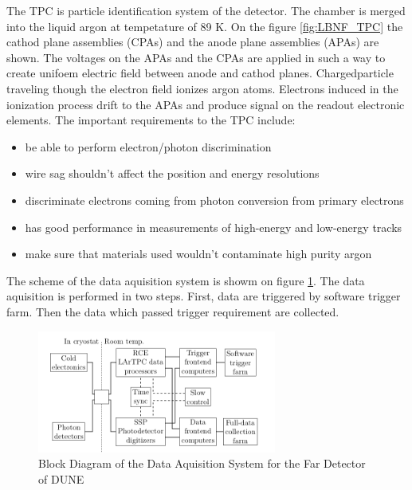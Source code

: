 The TPC is particle identification system of the detector. The chamber is merged into the liquid argon at tempetature of 89 K. On the figure \ref{fig:LBNF_TPC} the cathod plane assemblies (CPAs) and the anode plane assemblies (APAs) are shown. The voltages on the APAs and the CPAs are applied in such a way to create unifoem electric field between anode and cathod planes. Chargedparticle traveling though the electron field ionizes argon atoms. Electrons induced in the ionization process drift to the APAs and produce signal on the readout electronic elements.
The important requirements to the TPC include:

\begin{itemize}
  \item be able to perform electron/photon discrimination
  \item wire sag shouldn't affect the position and energy resolutions
  \item discriminate electrons coming from photon conversion from primary electrons
  \item has good performance in measurements of high-energy and low-energy tracks
  \item make sure that materials used wouldn't contaminate high purity argon
\end{itemize}

The scheme of the data aquisition system is showm on figure \ref{fig:LBNF_DAQ}. The data aquisition is performed in two steps. First, data are triggered by software trigger farm. Then the data which passed trigger requirement are collected.

\begin{figure}
\caption{Block Diagram of the Data Aquisition System for the Far Detector of DUNE}
\label{fig:LBNF_DAQ}
\centering
\includegraphics[width=0.70\textwidth, keepaspectratio=true]{figs/LBNF_DAQ.png}
\end{figure}
